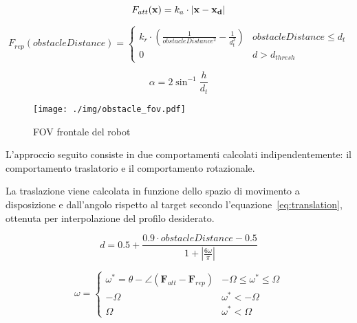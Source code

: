 \documentclass[10pt]{beamer}
\begin{document}
	\begin{equation}\label{eq:attractive-force}
		F_{att}( \textbf{x}) = k_a\cdot \left| {\bf x - x_d} \right| 
	\end{equation}

	\begin{equation}\label{eq:repulsive-force}
		F_{rep}(obstacleDistance) = \begin{cases}
			k_r \cdot \left(
				\frac{1}{obstacleDistance^2}-
				\frac{1}{d_t^2}
			\right)  & obstacleDistance \leq d_{t} \\
			0 & d > d_{thresh}
		\end{cases}
	\end{equation}

	\begin{equation}\label{eq:obstacle_fov}
		\alpha = {2}\sin^{-1}{\frac{h}{d_t}}
	\end{equation}

	\begin{figure}[H]
		\centering
		\texttt{[image: ./img/obstacle\_fov.pdf]}
		\caption{FOV frontale del robot}
		\label{fig:obstacle_fov}
	\end{figure}

	L'approccio seguito consiste in due comportamenti calcolati
	indipendentemente: il comportamento traslatorio e il comportamento
	rotazionale.

	La traslazione viene calcolata in funzione dello spazio di movimento a
	disposizione e dall'angolo rispetto al target secondo
	l'equazione~\ref{eq:translation}, ottenuta per interpolazione del profilo
	desiderato.

	\begin{equation}\label{eq:translation}
		d = 0.5 + \frac	{0.9\cdot obstacleDistance - 0.5}
		{1 + \left|
				\frac{6\omega}{\pi}
		\right|  } 
	\end{equation}
	
	\begin{equation}\label{eq:angle}
		\omega = \begin{cases}
			\omega^*=\theta - \angle\left( \textbf{F}_{att} - \textbf{F}_{rep} \right)  & -\Omega \le \omega^* \le \Omega \\
			-\Omega & \omega^* < -\Omega \\
			\Omega & \omega^* < \Omega

		\end{cases}	\end{equation}
	
\end{document}
